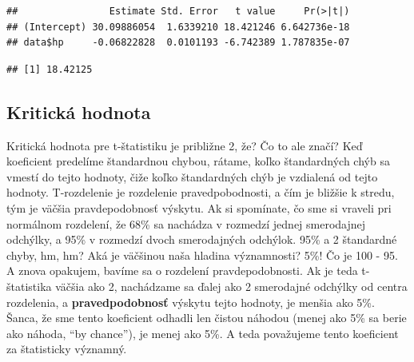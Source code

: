 \begin{verbatim}
##                Estimate Std. Error   t value     Pr(>|t|)
## (Intercept) 30.09886054  1.6339210 18.421246 6.642736e-18
## data$hp     -0.06822828  0.0101193 -6.742389 1.787835e-07
\end{verbatim}

\begin{Shaded}
\begin{Highlighting}[]

\StringTok{ }\OperatorTok{$}\NormalTok{coefficients[}\NormalTok{, }\NormalTok{] }\OperatorTok{/}\StringTok{ }\OperatorTok{$}\NormalTok{coefficients[}\NormalTok{, }\NormalTok{]}

\end{Highlighting}
\end{Shaded}

\begin{verbatim}
## [1] 18.42125
\end{verbatim}

\hypertarget{kritickuxe1-hodnota}{%
\subsection{Kritická hodnota}\label{kritickuxe1-hodnota}}

Kritická hodnota pre t-štatistiku je približne 2, že? Čo to ale značí?
Keď koeficient predelíme štandardnou chybou, rátame, koľko štandardných
chýb sa vmestí do tejto hodnoty, čiže koľko štandardných chýb je
vzdialená od tejto hodnoty. T-rozdelenie je rozdelenie pravedpobodnosti,
a čím je bližšie k stredu, tým je väčšia pravdepodobnosť výskytu. Ak si
spomínate, čo sme si vraveli pri normálnom rozdelení, že 68\% sa
nachádza v rozmedzí jednej smerodajnej odchýlky, a 95\% v rozmedzí dvoch
smerodajných odchýlok. 95\% a 2 štandardné chyby, hm, hm? Aká je
väčšinou naša hladina významnosti? 5\%! Čo je 100 - 95. A znova
opakujem, bavíme sa o rozdelení pravdepodobnosti. Ak je teda
t-štatistika väčšia ako 2, nachádzame sa ďalej ako 2 smerodajné odchýlky
od centra rozdelenia, a \textbf{pravedpodobnosť} výskytu tejto hodnoty,
je menšia ako 5\%. Šanca, že sme tento koeficient odhadli len čistou
náhodou (menej ako 5\% sa berie ako náhoda, ``by chance''), je menej ako
5\%. A teda považujeme tento koeficient za štatisticky významný.

